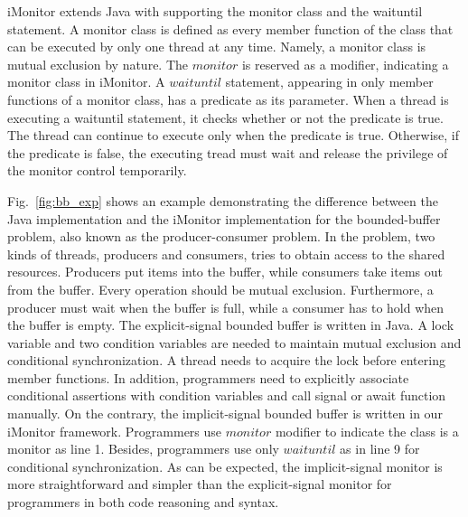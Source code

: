 \documentclass[preprint]{sigplanconf}
\begin{document}
iMonitor extends Java with supporting the monitor class and the waituntil 
statement. A monitor class is defined as every member function of the class 
that can be executed by only one thread at any time. Namely, a monitor class is
mutual  exclusion by nature. The $monitor$ is reserved as a modifier, 
indicating a monitor class in iMonitor. A $waituntil$ statement, appearing in 
only member functions of a monitor class, has a predicate as its parameter. 
When a thread is executing a waituntil statement, it checks whether or not the 
predicate is true. The thread can continue to execute only when the predicate
is true. Otherwise, if the predicate is false, the executing tread must wait 
and release the privilege of the monitor control temporarily. 

Fig.~\ref{fig:bb_exp} shows an example demonstrating the difference between 
the Java implementation and the iMonitor implementation for the 
bounded-buffer problem, also known as the producer-consumer problem. 
In the problem, two kinds of threads, producers and consumers, tries to obtain 
access to the shared resources. Producers put items 
into the buffer, while consumers take items out from the buffer. Every 
operation should be mutual exclusion. Furthermore, a producer must wait  
when the buffer is full, while a consumer has to hold when the 
buffer is empty. The explicit-signal bounded buffer is written in Java. A 
lock variable and two condition variables are needed to maintain mutual exclusion 
and conditional synchronization. A thread needs to acquire the lock before entering member
functions. In addition, programmers need to explicitly associate conditional 
assertions with condition variables and call signal or await function manually.
On the contrary, 
the implicit-signal bounded buffer is written in our iMonitor framework.
Programmers use $monitor$ modifier to indicate the class is a monitor as line 
1. Besides, programmers use only $waituntil$ as in line 9 for conditional
synchronization. As can be expected, the implicit-signal monitor is
more straightforward and simpler than the explicit-signal monitor for
programmers in both code reasoning and syntax. 
\end{document}
